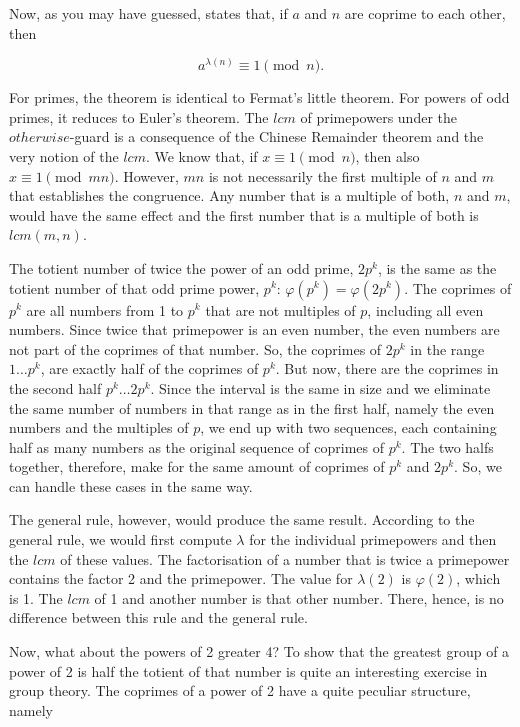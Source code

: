 \documentclass[tikz]{scrreprt}
\newcommand{\Varid}[1]{\mathit{#1}}
\begin{document}
Now, as you may have guessed,
 states that,
if $a$ and $n$ are coprime to each other, then

\begin{equation}
a^{\lambda(n)} \equiv 1 \pmod{n}.
\end{equation}

For primes, the theorem is identical to
Fermat's little theorem. For powers of
odd primes, it reduces to Euler's theorem.
The \ensuremath{\Varid{lcm}} of primepowers under the \ensuremath{\Varid{otherwise}}-guard
is a consequence of the Chinese Remainder theorem 
and the very notion of the \ensuremath{\Varid{lcm}}. 
We know that, 
if $x \equiv 1 \pmod{n}$, then also $x \equiv 1 \pmod{mn}$.
However, $mn$ is not necessarily
the first multiple of $n$ and $m$ that establishes
the congruence. Any number that is a multiple of both,
$n$ and $m$, would have the same effect and the first number
that is a multiple of both is $lcm(m,n)$.

The totient number of twice the power of an odd prime,
$2p^k$,
is the same as the totient number of that odd prime power,
$p^k$: $\varphi(p^k) = \varphi(2p^k)$.
The coprimes of $p^k$ are all numbers
from 1 to $p^k$ that are not multiples of $p$,
including all even numbers.
Since twice that primepower is an even number,
the even numbers are not part of the coprimes of that number.
So, the coprimes of $2p^k$ in the range 
$1\dots p^k$, are exactly half of the coprimes of $p^k$.
But now, there are the coprimes in the second half
$p^k\dots 2p^k$. 
Since the interval is the same in size
and we eliminate the same number of numbers in that range
as in the first half, namely the even numbers and
the multiples of $p$, we end up with two sequences,
each containing half as many numbers as the original
sequence of coprimes of $p^k$. The two halfs together,
therefore, make for the same amount of coprimes
of $p^k$ and $2p^k$.
So, we can handle these cases in the same way.

The general rule, however, would produce the same result.
According to the general rule, we would first
compute $\lambda$ for the individual primepowers
and then the \ensuremath{\Varid{lcm}} of these values.
The factorisation of a number that is twice a primepower 
contains the factor 2 and the primepower.
The value for $\lambda(2)$ is $\varphi(2)$,
which is 1. The \ensuremath{\Varid{lcm}} of 1 and another number
is that other number. There, hence,
is no difference between this rule and
the general rule.

Now, what about the powers of 2 greater 4?
To show that the greatest group of a power of 2
is half the totient of that number 
is quite an interesting exercise in group theory.
The coprimes of a power of 2 have a quite peculiar
structure, namely
\end{document}

